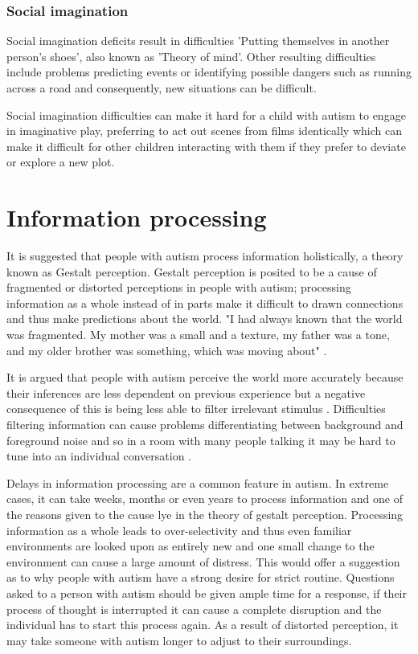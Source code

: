 \documentclass[11pt]{report}
\begin{document}
\subsubsection*{Social imagination}
Social imagination deficits result in difficulties 'Putting themselves in another person's shoes', also known as 'Theory of mind'. Other resulting difficulties include problems predicting events or identifying possible dangers such as running across a road and consequently, new situations can be difficult.\cite{nas}

Social imagination difficulties can make it hard for a child with autism to engage in imaginative play, preferring to act out scenes from films identically which can make it difficult for other children interacting with them if they prefer to deviate or explore a new plot.\cite{nas}

\section{Information processing}

It is suggested that people with autism process information holistically, a theory known as Gestalt perception. Gestalt perception is posited to be a cause of fragmented or distorted perceptions in people with autism\cite{olgab}; processing information as a whole instead of in parts make it difficult to drawn connections and thus make predictions about the world. "I had always known that the world was fragmented. My mother was a small and a texture, my father was a tone, and my older brother was something, which was moving about" \cite{williams1992}. 

It is argued that people with autism perceive the world more accurately because their inferences are less dependent on previous experience but a negative consequence of this is being less able to filter irrelevant stimulus \cite{bayes}. Difficulties filtering information can cause problems differentiating between background and foreground noise and so in a room with many people talking it may be hard to tune into an individual conversation \cite{bayes}. 

Delays in information processing are a common feature in autism. In extreme cases, it can take weeks, months or even years to process information and one of the reasons given to the cause lye in the theory of gestalt perception. Processing information as a whole leads to over-selectivity and thus even familiar environments are looked upon as entirely new and one small change to the environment can cause a large amount of distress\cite{olgab}. This would offer a suggestion as to why people with autism have a strong desire for strict routine. Questions asked to a person with autism should be given ample time for a response, if their process of thought is interrupted it can cause a complete disruption and the individual has to start this process again\cite{olgab}. As a result of distorted perception, it may take someone with autism longer to adjust to their surroundings. 
\end{document}
